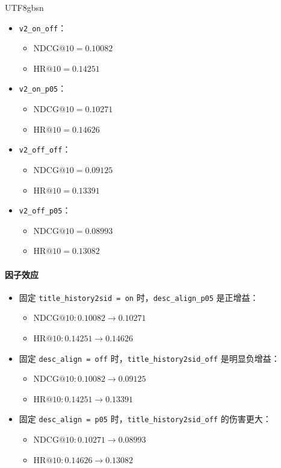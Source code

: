 \documentclass[11pt]{article}
\begin{document}
\begin{CJK*}{UTF8}{gbsn}
\begin{itemize}
  \item \texttt{v2\_on\_off}：
  \begin{itemize}
    \item \(\mathrm{NDCG}@10 = 0.10082\)
    \item \(\mathrm{HR}@10 = 0.14251\)
  \end{itemize}
  \item \texttt{v2\_on\_p05}：
  \begin{itemize}
    \item \(\mathrm{NDCG}@10 = 0.10271\)
    \item \(\mathrm{HR}@10 = 0.14626\)
  \end{itemize}
  \item \texttt{v2\_off\_off}：
  \begin{itemize}
    \item \(\mathrm{NDCG}@10 = 0.09125\)
    \item \(\mathrm{HR}@10 = 0.13391\)
  \end{itemize}
  \item \texttt{v2\_off\_p05}：
  \begin{itemize}
    \item \(\mathrm{NDCG}@10 = 0.08993\)
    \item \(\mathrm{HR}@10 = 0.13082\)
  \end{itemize}
\end{itemize}

\paragraph{因子效应}

\begin{itemize}
  \item 固定 \texttt{title\_history2sid = on} 时，\texttt{desc\_align\_p05} 是正增益：
  \begin{itemize}
    \item \(\mathrm{NDCG}@10: 0.10082 \rightarrow 0.10271\)
    \item \(\mathrm{HR}@10: 0.14251 \rightarrow 0.14626\)
  \end{itemize}
  \item 固定 \texttt{desc\_align = off} 时，\texttt{title\_history2sid\_off} 是明显负增益：
  \begin{itemize}
    \item \(\mathrm{NDCG}@10: 0.10082 \rightarrow 0.09125\)
    \item \(\mathrm{HR}@10: 0.14251 \rightarrow 0.13391\)
  \end{itemize}
  \item 固定 \texttt{desc\_align = p05} 时，\texttt{title\_history2sid\_off} 的伤害更大：
  \begin{itemize}
    \item \(\mathrm{NDCG}@10: 0.10271 \rightarrow 0.08993\)
    \item \(\mathrm{HR}@10: 0.14626 \rightarrow 0.13082\)
  \end{itemize}
\end{itemize}


\end{CJK*}
\end{document}
